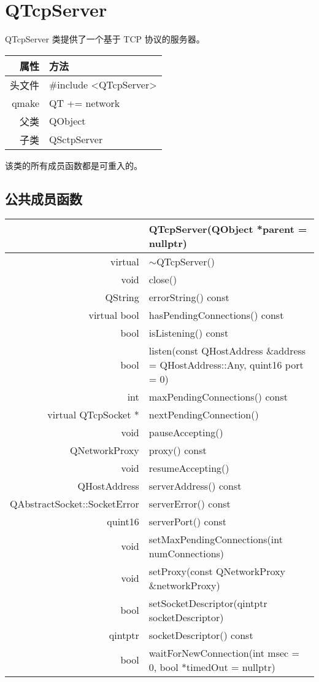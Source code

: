 \chapter{QTcpServer}

QTcpServer 类提供了一个基于 TCP 协议的服务器。

\begin{tabular}{|r|l|}
	\hline
	属性 & 方法 \\
	\hline
	头文件 & \#include <QTcpServer>\\      
	\hline
	qmake & QT += network\\      
	\hline
	父类	  & QObject \\ 
	\hline
    子类	 & QSctpServer \\ 
	\hline
\end{tabular}


\begin{notice}
该类的所有成员函数都是可重入的。
\end{notice}

\section{公共成员函数}

\begin{longtable}[l]{|r|l|}
	\hline
		& QTcpServer(QObject *parent = nullptr) \\
	\hline
	 virtual	& $\sim$QTcpServer() \\ 
	\hline
void	 & close() \\ 
\hline
QString	& errorString() const \\
\hline
virtual bool	& hasPendingConnections() const \\ 
\hline
bool	& isListening() const \\ 
\hline
bool	& listen(const QHostAddress \&address = QHostAddress::Any, quint16 port = 0) \\ 
\hline
int	& maxPendingConnections() const \\
\hline
virtual QTcpSocket *	& nextPendingConnection()\\
\hline
void	 & pauseAccepting() \\ 
\hline
QNetworkProxy	& proxy() const\\
\hline
void	 & resumeAccepting()\\
\hline
QHostAddress & 	serverAddress() const\\
\hline
QAbstractSocket::SocketError	 & serverError() const \\
\hline
quint16	 & serverPort() const\\
\hline
void	 & setMaxPendingConnections(int numConnections)\\
\hline
void	 & setProxy(const QNetworkProxy \&networkProxy)\\
\hline
bool	& setSocketDescriptor(qintptr socketDescriptor)\\
\hline
qintptr	& socketDescriptor() const\\
\hline
bool	& waitForNewConnection(int msec = 0, bool *timedOut = nullptr)\\
	\hline
\end{longtable}


